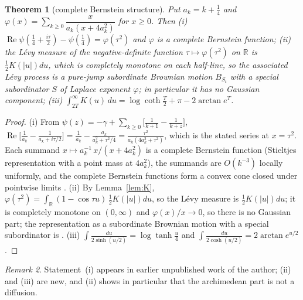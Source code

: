 \documentclass[11pt]{amsart}
\newtheorem{theorem}{Theorem}[section]
\theoremstyle{definition}
\theoremstyle{remark}
\newtheorem{remark}[theorem]{Remark}
\newcommand{\R}{\mathbb R}
\newcommand{\Rel}{\operatorname{Re}}
\begin{document}
\begin{theorem}[complete Bernstein structure]\label{thm:S}
Put $a_k=k+\frac14$ and $\varphi(x)=\sum_{k\ge0}\dfrac{x}{a_k(x+4a_k^2)}$ for $x\ge0$. Then
\emph{(i)} $\Rel\psi(\frac14+\frac{i\tau}2)-\psi(\frac14)=\varphi(\tau^2)$ and $\varphi$ is a
complete Bernstein function; \emph{(ii)} the L\'evy measure of the negative-definite function
$\tau\mapsto\varphi(\tau^2)$ on $\R$ is $\frac12K(|u|)du$, which is completely monotone on each
half-line, so the associated L\'evy process is a pure-jump subordinate Brownian motion
$B_{S_t}$ with a special subordinator $S$ of Laplace exponent $\varphi$; in particular it has no
Gaussian component; \emph{(iii)} $\int_{2T}^\infty K(u)\,du=\log\coth\frac T2+\pi-2\arctan e^{T}$.
\end{theorem}
\begin{proof}
(i) From $\psi(z)=-\gamma+\sum_{k\ge0}\big[\frac1{k+1}-\frac1{k+z}\big]$,
$\Rel\big[\frac1{a_k}-\frac1{a_k+i\tau/2}\big]=\frac1{a_k}-\frac{a_k}{a_k^2+\tau^2/4}
=\frac{\tau^2}{a_k(4a_k^2+\tau^2)}$, which is the stated series at $x=\tau^2$. Each summand
$x\mapsto a_k^{-1}\,x/(x+4a_k^2)$ is a complete Bernstein function (Stieltjes representation with
a point mass at $4a_k^2$), the summands are $O(k^{-3})$ locally uniformly, and the complete
Bernstein functions form a convex cone closed under pointwise limits
\cite[Ch.~6--7]{SSV2012}. (ii) By Lemma~\ref{lem:K}, $\varphi(\tau^2)=\int_\R(1-\cos\tau u)\,
\frac12K(|u|)du$, so the L\'evy measure is $\frac12K(|u|)du$; it is completely monotone on
$(0,\infty)$ and $\varphi(x)/x\to0$, so there is no Gaussian part; the representation as a
subordinate Brownian motion with a special subordinator is \cite[Thm.~13.10, Cor.~13.12]{SSV2012}.
(iii) $\int\frac{du}{2\sinh(u/2)}=\log\tanh\frac u4$ and $\int\frac{du}{2\cosh(u/2)}=2\arctan e^{u/2}$.
\end{proof}

\begin{remark}
Statement~(i) appears in earlier unpublished work of the author; (ii) and (iii) are new, and (ii)
shows in particular that the archimedean part is not a diffusion.
\end{remark}
\end{document}
